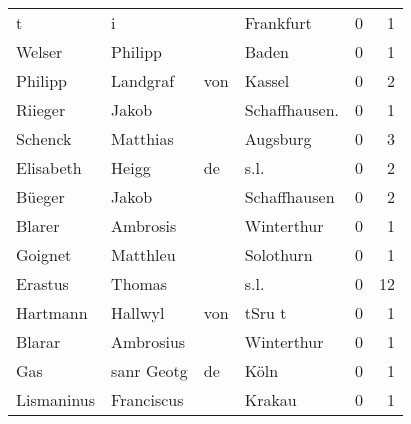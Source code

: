 \begin{tabular}{llllrr}
                        t &                                  i &             &                                   Frankfurt &          0 &         1 \\
                   Welser &                            Philipp &             &                                       Baden &          0 &         1 \\
                  Philipp &                           Landgraf &         von &                                      Kassel &          0 &         2 \\
                  Riieger &                              Jakob &             &                              Schaffhausen.  &          0 &         1 \\
                  Schenck &                           Matthias &             &                                    Augsburg &          0 &         3 \\
                Elisabeth &                              Heigg &          de &                                        s.l. &          0 &         2 \\
                   Büeger &                              Jakob &             &                                Schaffhausen &          0 &         2 \\
                   Blarer &                           Ambrosis &             &                                  Winterthur &          0 &         1 \\
                  Goignet &                           Matthleu &             &                                   Solothurn &          0 &         1 \\
                  Erastus &                             Thomas &             &                                        s.l. &          0 &        12 \\
                 Hartmann &                            Hallwyl &         von &                                      tSru t &          0 &         1 \\
                   Blarar &                          Ambrosius &             &                                  Winterthur &          0 &         1 \\
                      Gas &                         sanr Geotg &          de &                                        Köln &          0 &         1 \\
               Lismaninus &                         Franciscus &             &                                      Krakau &          0 &         1 \\

\end{tabular}
